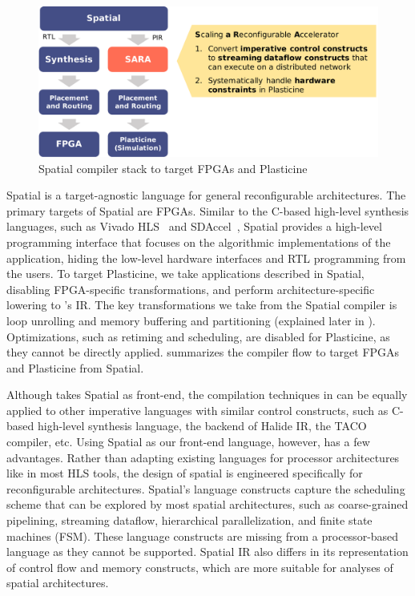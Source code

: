 \begin{figure}
\centering
\includegraphics[width=1\textwidth]{figs/spatialstack.pdf}
\caption[Spatial compiler stack to target FPGAs and Plasticine]{
  Spatial compiler stack to target FPGAs and Plasticine
}
\label{fig:spatialstack}
\end{figure}

Spatial is a target-agnostic language for general reconfigurable architectures. 
The primary targets of Spatial are FPGAs.
Similar to the C-based high-level synthesis languages, such as Vivado HLS~\cite{vivado} and
SDAccel~\cite{sdaccel},
Spatial provides a high-level programming interface that focuses on the algorithmic 
implementations of the application, hiding the low-level hardware interfaces and RTL programming from the
users.
To target Plasticine, we take applications described in Spatial, disabling FPGA-specific
transformations, and perform architecture-specific lowering to \name's IR.
The key transformations we take from the Spatial compiler is loop unrolling and memory buffering and partitioning
(explained later in ).
Optimizations, such as retiming and scheduling, are disabled for Plasticine, as they cannot be
directly applied.
 summarizes the compiler flow to target FPGAs and Plasticine from Spatial.

Although \name takes Spatial as front-end, the compilation techniques in \name can be equally
applied to other imperative languages with similar control constructs, such as C-based high-level
synthesis language, the backend of Halide IR, the TACO compiler, etc.
Using Spatial as our front-end language, however, has a few advantages.
Rather than adapting existing languages for processor architectures like in most HLS tools, 
the design of spatial is engineered specifically for reconfigurable architectures.
Spatial's language constructs capture the scheduling scheme that can be explored by most
spatial architectures, such as coarse-grained pipelining, streaming dataflow, hierarchical parallelization, 
and finite state machines (FSM).
These language constructs are missing from a processor-based language as they cannot be supported.
Spatial IR also differs in its representation of control flow and memory constructs, which are more suitable for analyses of spatial architectures.

